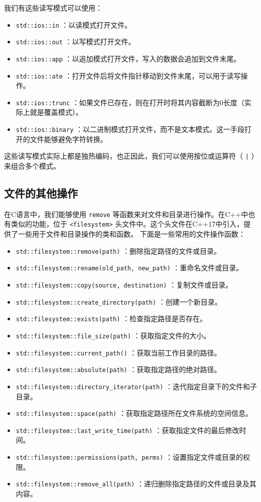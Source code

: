 我们有这些读写模式可以使用：
\begin{itemize}
  \item \texttt{std::ios::in} ：以读模式打开文件。
  \item \texttt{std::ios::out} ：以写模式打开文件。
  \item \texttt{std::ios::app} ：以追加模式打开文件，写入的数据会追加到文件末尾。
  \item \texttt{std::ios::ate} ：打开文件后将文件指针移动到文件末尾，可以用于读写操作。
  \item \texttt{std::ios::trunc} ：如果文件已存在，则在打开时将其内容截断为0长度（实际上就是覆盖模式）。
  \item \texttt{std::ios::binary} ：以二进制模式打开文件，而不是文本模式。这一手段打开的文件能够避免字符转换。
\end{itemize}
这些读写模式实际上都是独热编码，也正因此，我们可以使用按位或运算符（ \texttt{|} ）来组合多个模式。

\subsection{文件的其他操作}

在C语言中，我们能够使用 \verb|remove| 等函数来对文件和目录进行操作。在C++中也有类似的功能，位于 \texttt{<filesystem>} 头文件中。这个头文件在C++17中引入，提供了一些用于文件和目录操作的类和函数。 下面是一些常用的文件操作函数：
\begin{itemize}
  \item \texttt{std::filesystem::remove(path)} ：删除指定路径的文件或目录。
  \item \texttt{std::filesystem::rename(old\_path, new\_path)} ：重命名文件或目录。
  \item \texttt{std::filesystem::copy(source, destination)} ：复制文件或目录。
  \item \texttt{std::filesystem::create\_directory(path)} ：创建一个新目录。
  \item \texttt{std::filesystem::exists(path)} ：检查指定路径是否存在。
  \item \texttt{std::filesystem::file\_size(path)} ：获取指定文件的大小。
  \item \texttt{std::filesystem::current\_path()} ：获取当前工作目录的路径。
  \item \texttt{std::filesystem::absolute(path)} ：获取指定路径的绝对路径。
  \item \texttt{std::filesystem::directory\_iterator(path)} ：迭代指定目录下的文件和子目录。
  \item \texttt{std::filesystem::space(path)} ：获取指定路径所在文件系统的空间信息。
  \item \texttt{std::filesystem::last\_write\_time(path)} ：获取指定文件的最后修改时间。
  \item \texttt{std::filesystem::permissions(path, perms)} ：设置指定文件或目录的权限。
  \item \texttt{std::filesystem::remove\_all(path)} ：递归删除指定路径的文件或目录及其内容。
\end{itemize}

